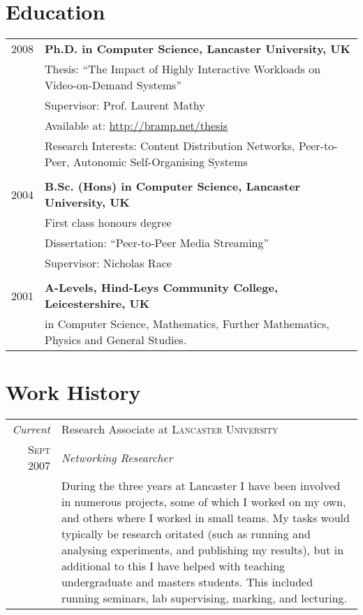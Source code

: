 \documentclass[a4paper,10pt]{article}
\begin{document}
\section{Education}
\begin{tabular}{rp{14cm}}	
 \textsc{2008} & \textbf{Ph.D. in Computer Science, Lancaster University, UK}\\
& Thesis: ``The Impact of Highly Interactive Workloads on Video-on-Demand Systems''\\
& Supervisor: Prof. Laurent Mathy\\
& Available at: \href{http://bramp.net/thesis}{http://bramp.net/thesis}\\
& Research Interests: Content Distribution Networks, Peer-to-Peer, Autonomic Self-Organising Systems\\
&\\

\textsc{2004} & \textbf{B.Sc. (Hons) in Computer Science, Lancaster University, UK}\\
& First class honours degree\\
& Dissertation: ``Peer-to-Peer Media Streaming''\\
& Supervisor: Nicholas Race\\
&\\

\textsc{2001} & \textbf{A-Levels, Hind-Leys Community College, Leicestershire, UK}\\
& in Computer Science, Mathematics, Further Mathematics, Physics and General Studies.\\

\end{tabular}

\section{Work History}
\begin{tabular}{r|p{13.5cm}}
 \emph{Current} & Research Associate at \textsc{Lancaster University} \\
 \textsc{Sept 2007} & \emph{Networking Researcher}\\
& During the three years at Lancaster I have been involved in numerous projects, some of which I worked on my own, and others where I worked in small teams. My tasks would typically be research oritated (such as running and analysing experiments, and publishing my results), but in additional to this I have helped with teaching undergraduate and masters students. This included running seminars, lab supervising, marking, and lecturing.\\


\end{tabular}
\end{document}
